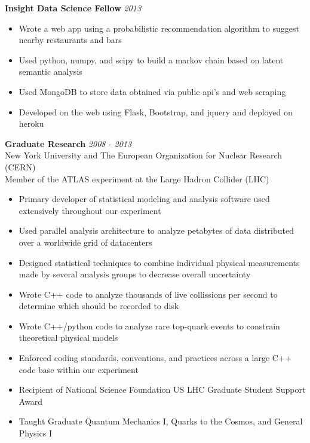 \documentclass[9pt]{article}
\newenvironment{changemargin}[2]{%
  \begin{list}{}{%
    \setlength{\topsep}{0pt}%
    \setlength{\leftmargin}{#1}%
    \setlength{\rightmargin}{#2}%
    \setlength{\listparindent}{\parindent}%
    \setlength{\itemindent}{\parindent}%
    \setlength{\parsep}{\parskip}%
  }%
  \item[]}{\end{list}
}
\newenvironment{body} {
	\vspace*{-16pt}
	\begin{changemargin}{-0.25in}{-0.5in}
  }	
	{\end{changemargin}
}
\begin{document}
\begin{body}
	\vspace{14pt}
	\textbf{Insight Data Science Fellow} \hfill \emph{2013}\\
        \begin{itemize}
        \item Wrote a web app using a probabilistic recommendation algorithm to suggest nearby restaurants and bars \\
        \item Used python, numpy, and scipy to build a markov chain based on latent semantic analysis \\
        \item Used MongoDB to store data obtained via public api's and web scraping \\
        \item Developed on the web using Flask, Bootstrap, and jquery and deployed on heroku \\
        \end{itemize}

        \medskip

	\textbf{Graduate Research} \hfill \emph{2008 - 2013}\\
	New York University and The European Organization for Nuclear Research (CERN) \\
        Member of the ATLAS experiment at the Large Hadron Collider (LHC) \\

        \medskip

        \begin{itemize}
        \item Primary developer of statistical modeling and analysis software used extensively throughout our experiment
        \item Used parallel analysis architecture to analyze petabytes of data distributed over a worldwide grid of datacenters
        \item Designed statistical techniques to combine individual physical measurements made by several analysis groups to decrease overall uncertainty
        \item Wrote C++ code to analyze thousands of live collissions per second to determine which should be recorded to disk
        \item Wrote C++/python code to analyze rare top-quark events to constrain theoretical physical models
        \item Enforced coding standards, conventions, and practices across a large C++ code base within our experiment
        \item Recipient of National Science Foundation US LHC Graduate Student Support Award
        \item Taught Graduate Quantum Mechanics I, Quarks to the Cosmos, and General Physics I


\end{itemize}
\end{body}
\end{document}
